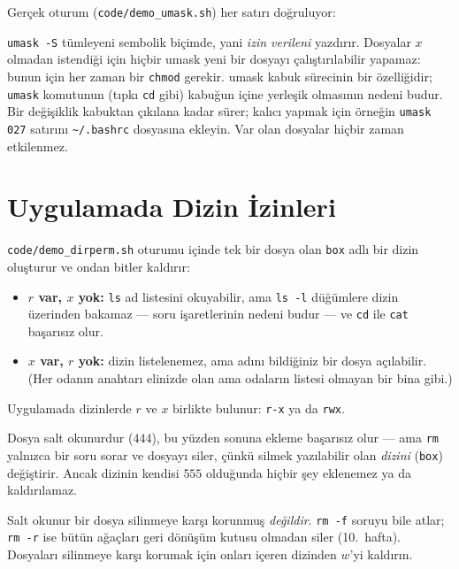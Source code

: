 \documentclass[11pt,a4paper]{article}
\newcommand{\cmd}[1]{\texttt{#1}}
\begin{document}
Gerçek oturum (\cmd{code/demo\_umask.sh}) her satırı doğruluyor:



\cmd{umask -S} tümleyeni sembolik biçimde, yani \emph{izin verileni} yazdırır. Dosyalar $x$ olmadan istendiği için hiçbir umask yeni bir dosyayı çalıştırılabilir yapamaz: bunun için her zaman bir \cmd{chmod} gerekir. umask kabuk sürecinin bir özelliğidir; \cmd{umask} komutunun (tıpkı \cmd{cd} gibi) kabuğun içine yerleşik olmasının nedeni budur. Bir değişiklik kabuktan çıkılana kadar sürer; kalıcı yapmak için örneğin \texttt{umask 027} satırını \texttt{\textasciitilde/.bashrc} dosyasına ekleyin. Var olan dosyalar hiçbir zaman etkilenmez.

\section{Uygulamada Dizin İzinleri}
\label{sec:dirs}

\cmd{code/demo\_dirperm.sh} oturumu içinde tek bir dosya olan \texttt{box} adlı bir dizin oluşturur ve ondan bitler kaldırır:



\begin{itemize}
  \item \textbf{$r$ var, $x$ yok:} \cmd{ls} ad listesini okuyabilir, ama \cmd{ls -l} düğümlere dizin üzerinden bakamaz --- soru işaretlerinin nedeni budur --- ve \cmd{cd} ile \cmd{cat} başarısız olur.
  \item \textbf{$x$ var, $r$ yok:} dizin listelenemez, ama adını bildiğiniz bir dosya açılabilir. (Her odanın anahtarı elinizde olan ama odaların listesi olmayan bir bina gibi.)
\end{itemize}
Uygulamada dizinlerde $r$ ve $x$ birlikte bulunur: \texttt{r-x} ya da \texttt{rwx}.



Dosya salt okunurdur ($444$), bu yüzden sonuna ekleme başarısız olur --- ama \cmd{rm} yalnızca bir soru sorar ve dosyayı siler, çünkü silmek yazılabilir olan \emph{dizini} (\texttt{box}) değiştirir. Ancak dizinin kendisi $555$ olduğunda hiçbir şey eklenemez ya da kaldırılamaz.

\begin{keyidea}
Salt okunur bir dosya silinmeye karşı korunmuş \emph{değildir}. \texttt{rm -f} soruyu bile atlar; \texttt{rm -r} ise bütün ağaçları geri dönüşüm kutusu olmadan siler (10.~hafta). Dosyaları silinmeye karşı korumak için onları içeren dizinden $w$'yi kaldırın.
\end{keyidea}
\end{document}
